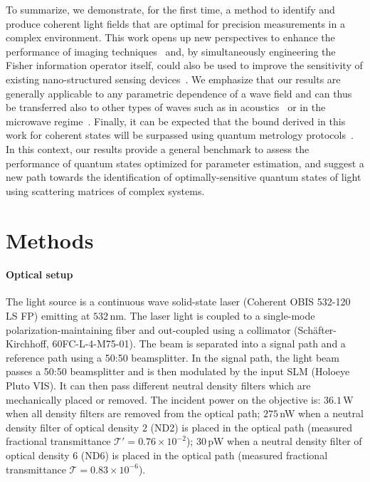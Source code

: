 \documentclass[aps,pra,twocolumn,amsmath,amssymb,superscriptaddress,10pt,nobibnotes]{revtex4-2}
\begin{document}
To summarize, we demonstrate, for the first time, a method to identify and produce coherent light fields that are optimal for precision measurements in a complex environment. This work opens up new perspectives to enhance the performance of imaging techniques~\cite{barrett_foundations_2013} and, by simultaneously engineering the Fisher information operator itself, could also be used to improve the sensitivity of existing nano-structured sensing devices~\cite{hodaei_enhanced_2017,chen_exceptional_2017}.
We emphasize that our results are generally applicable to any parametric dependence of a wave field and can thus be transferred also to other types of waves such as in acoustics~\cite{gerardin_full_2014} or in the microwave regime~\cite{shi_transmission_2012}. 
Finally, it can be expected that the bound derived in this work for coherent states will be surpassed using quantum metrology protocols~\cite{giovannetti_quantum_2006,giovannetti_advances_2011,fiderer_maximal_2019}. In this context, our results provide a general benchmark to assess the performance of quantum states optimized for parameter estimation, and suggest a new path towards the identification of optimally-sensitive quantum states of light using scattering matrices of complex systems.



\section*{Methods}

\paragraph*{Optical setup}

The light source is a continuous wave solid-state laser (Coherent OBIS 532-120 LS FP) emitting at $532$\,nm. The laser light is coupled to a single-mode polarization-maintaining fiber and out-coupled using a collimator (Schäfter-Kirchhoff, 60FC-L-4-M75-01). The beam is separated into a signal path and a reference path using a 50:50 beamsplitter. In the signal path, the light beam passes a 50:50 beamsplitter and is then modulated by the input SLM (Holoeye Pluto VIS). It can then pass different neutral density filters which are mechanically placed or removed. The incident power on the objective is: $36.1$\,\textmu W when all density filters are removed from the optical path; $275$\,nW when a neutral density filter of optical density $2$ (ND2) is placed in the optical path (measured fractional transmittance $\mathcal{T}'=0.76 \times 10^{-2}$); $30$\,pW when a neutral density filter of optical density $6$ (ND6) is placed in the optical path (measured fractional transmittance $\mathcal{T}=0.83 \times 10^{-6}$).
\end{document}
